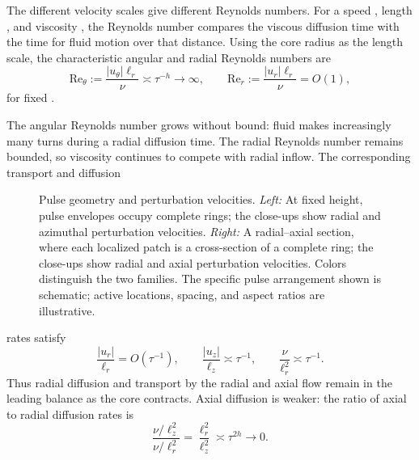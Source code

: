 The different velocity scales give different Reynolds numbers. For a speed
, length ,
and viscosity , the Reynolds number  compares the viscous diffusion time
 with
the time  for fluid motion over that distance. Using the core radius as the length scale,
the characteristic angular and radial Reynolds numbers are
\begin{equation*}
  \mathrm{Re}_\theta:=\frac{|u_\theta|\ell_r}{\nu}\asymp\tau^{-h}\longrightarrow\infty,
  \qquad
  \mathrm{Re}_r:=\frac{|u_r|\ell_r}{\nu}=O(1),
\end{equation*}
for fixed .

The angular Reynolds number grows without bound: fluid makes increasingly many
turns during a radial diffusion time. The radial Reynolds number remains bounded, so
viscosity continues to compete with radial inflow. The corresponding transport and diffusion
%
\begin{figure}[t]
  \centering
  \caption{Pulse geometry and perturbation velocities. \emph{Left:} At fixed height,
  pulse envelopes occupy complete rings; the close-ups show radial and azimuthal
  perturbation velocities. \emph{Right:} A radial--axial section, where each
  localized patch is a cross-section of a complete ring; the close-ups show radial
  and axial perturbation velocities. Colors distinguish the two families. The
  specific pulse arrangement shown is schematic; active locations, spacing, and
  aspect ratios are illustrative.}\label{fig:2}
\end{figure}%
rates satisfy
\begin{equation*}
  \frac{|u_r|}{\ell_r}=O(\tau^{-1}),
  \qquad \frac{|u_z|}{\ell_z}\asymp\tau^{-1},
  \qquad \frac{\nu}{\ell_r^2}\asymp\tau^{-1}.
\end{equation*}
Thus radial diffusion and transport by the radial and axial flow remain in the leading balance
as the core contracts. Axial diffusion is weaker: the ratio of axial to radial diffusion rates is
\begin{equation*}
  \frac{\nu/\ell_z^2}{\nu/\ell_r^2}
  =\frac{\ell_r^2}{\ell_z^2}
  \asymp\tau^{2h}\longrightarrow0.
\end{equation*}

